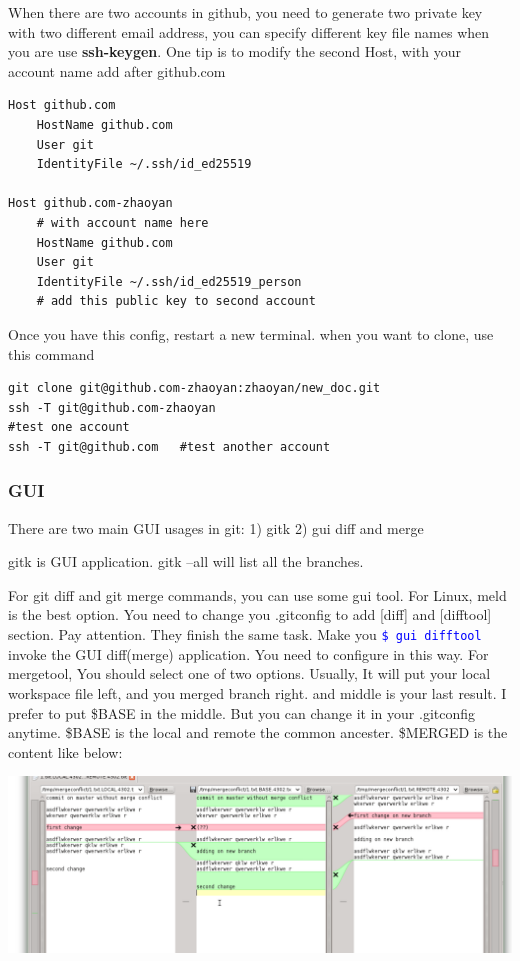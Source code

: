\documentclass[paper=8.5in:11in, twoside, 12pt, pagesize=pdftex]{book}
\newcommand{\linuxcommand}[1]{\texttt{\textcolor{blue}{\$ #1 \Pisymbol{psy}{191}}}}
\begin{document}
	When there are two accounts in github, you need to generate two private key with two different email address, you can specify different key file names when you are use \textbf{ssh-keygen}. One tip is to modify the second Host, with your account name add after github.com
\begin{lstlisting}
Host github.com
	HostName github.com
	User git
	IdentityFile ~/.ssh/id_ed25519
	
Host github.com-zhaoyan
	# with account name here
	HostName github.com
	User git
	IdentityFile ~/.ssh/id_ed25519_person 
	# add this public key to second account
\end{lstlisting}
	
	Once you have this config, restart a new terminal. when you want to clone, use this command
\begin{lstlisting}
git clone git@github.com-zhaoyan:zhaoyan/new_doc.git
ssh -T git@github.com-zhaoyan
#test one account
ssh -T git@github.com   #test another account	
\end{lstlisting}	
	

\subsubsection{GUI}
	There are two main GUI usages in git: 1) gitk 2) gui diff and merge    
	
	gitk is GUI application. gitk --all will list all the branches.
	
	For git diff and git merge commands, you can use some gui tool. For Linux, meld is the best option. You need to change you .gitconfig to add [diff] and [difftool] section. Pay attention. They finish the same task. Make you \linuxcommand{gui difftool} invoke the GUI diff(merge) application. You need to configure in this way. For mergetool, You should select one of two options. Usually, It will put your local workspace file left, and you merged branch right. and middle is your last result. I prefer to put \$BASE in the middle. But you can change it in your .gitconfig anytime. 
\$BASE is the local and remote the common ancester. \$MERGED is the content like below:

\begin{center}
	\includegraphics[scale=0.4]{pics/base.png}
\end{center}
\end{document}
